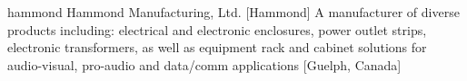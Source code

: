\newglsXcompany%
{hammond}%
{Hammond Manufacturing, Ltd.}%
[Hammond]%
{A manufacturer of diverse products including: electrical and electronic enclosures, power outlet strips, electronic transformers, as well as equipment rack and cabinet solutions for audio-visual, pro-audio and data/comm applications \cite{website:Hammond_Manufacturing}}%
[Guelph, Canada]%